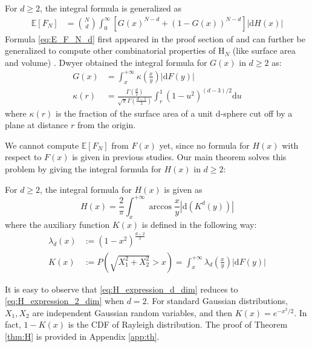 \documentclass{aptpub}
\def\E{\mathbb{E}}
\def\d{\mathrm{d}}
\begin{document}
For $d\geq 2$, the integral formula is generalized as
\begin{align}
     \E[F_N] &= \binom{N}{d} \int_0^{\infty} 
     \left[G(x)^{N-d} + (1-G(x))^{N-d} \right]|\mathrm{d} H(x)| 
     \label{eq:E_F_N_d}
\end{align}
Formula \eqref{eq:E_F_N_d} first appeared in the proof section of \cite{raynaud1970enveloppe}
and can further be generalized to compute other combinatorial properties of $\mathrm{H}_N$ (like surface area and volume)
\cite{barany2008random}.
Dwyer obtained the integral formula for $G(x)$ in $d\geq 2$ as:
\begin{align}\label{eq:G_d_kappa}
     G(x) & = \int_x^{+\infty} \kappa \left(\frac{x}{y} \right) |\mathrm{d}F(y)| \\
     \kappa(r) & = \frac{\Gamma(\frac{d}{2})}
     {\sqrt{\pi}\Gamma(\frac{d-1}{2})}\int_r^{1}
     (1-u^2)^{(d-3)/2}\mathrm{d}u\label{eq:kappa_r}
\end{align}
where $\kappa(r)$ is the fraction of the surface area of a unit d-sphere
cut off by a plane at distance $r$ from the origin.

We cannot compute $\E[F_N]$ from $F(x)$ yet, since no formula for $H(x)$ with respect to $F(x)$ is given in previous studies.
Our main theorem solves this problem by giving the integral formula for $H(x)$ in $d\geq 2$:
\begin{theorem}\label{thm:H}
For $d\geq 2$, the integral formula for $H(x)$ is given as
\begin{equation}
     H(x) = \frac{2}{\pi}
     \int_x^{+\infty} \arccos\frac{x}{y}
     |\mathrm{d} (K^d(y))|\label{eq:H_expression_d_dim}
\end{equation}
where the auxiliary function $K(x)$ is defined in the following way:
\begin{align}
     \lambda_d(x) & :=(1-x^2)^{\frac{d-2}{2}}
     \label{eq:lambda_r}\\
     K(x) &:=P\left(\sqrt{X_1^2+X_2^2}>x \right)=
     \int_x^{+\infty}
     \lambda_d \left(\frac{x}{y} \right)|\d F(y)|
     \label{eq:K_x}
\end{align}
\end{theorem}
It is easy to observe that \eqref{eq:H_expression_d_dim} reduces to 
\eqref{eq:H_expression_2_dim} when $d=2$.
For standard Gaussian distributions, $X_1, X_2$ are independent
Gaussian random variables, and then $K(x) = e^{-x^2/2}$.
In fact, $1-K(x)$ is the CDF of Rayleigh distribution.
The proof of Theorem \ref{thm:H}
is provided in Appendix \ref{app:th}.
\end{document}
